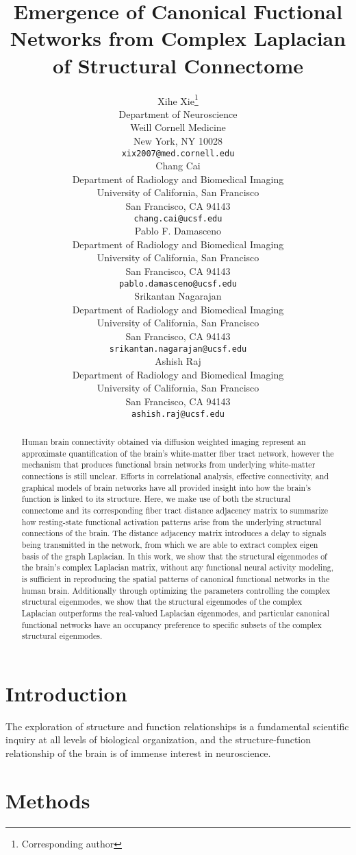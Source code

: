 \documentclass{article}
\title{Emergence of Canonical Fuctional Networks from Complex Laplacian of Structural Connectome}
\author{
  Xihe Xie\thanks{Corresponding author} \\
  Department of Neuroscience\\
  Weill Cornell Medicine\\
  New York, NY 10028 \\
  \texttt{xix2007@med.cornell.edu} \\
   \And
  Chang Cai \\
  Department of Radiology and Biomedical Imaging\\
  University of California, San Francisco\\
  San Francisco, CA 94143\\
  \texttt{chang.cai@ucsf.edu} \\
   \And
  Pablo F. Damasceno \\
  Department of Radiology and Biomedical Imaging\\
  University of California, San Francisco\\
  San Francisco, CA 94143\\
  \texttt{pablo.damasceno@ucsf.edu}\\
  \And
  Srikantan Nagarajan \\
  Department of Radiology and Biomedical Imaging\\
  University of California, San Francisco\\
  San Francisco, CA 94143\\
  \texttt{srikantan.nagarajan@ucsf.edu} \\
  \And
  Ashish Raj \\
  Department of Radiology and Biomedical Imaging\\
  University of California, San Francisco\\
  San Francisco, CA 94143\\
  \texttt{ashish.raj@ucsf.edu} \\
}
\begin{document}
\maketitle

\begin{abstract}
Human brain connectivity obtained via diffusion weighted imaging represent an approximate quantification of the brain's white-matter fiber tract network, however the mechanism that produces functional brain networks from underlying white-matter connections is still unclear. Efforts in correlational analysis, effective connectivity, and graphical models of brain networks have all provided insight into how the brain's function is linked to its structure. Here, we make use of both the structural connectome and its corresponding fiber tract distance adjacency matrix to summarize how resting-state functional activation patterns arise from the underlying structural connections of the brain. The distance adjacency matrix introduces a delay to signals being transmitted in the network, from which we are able to extract complex eigen basis of the graph Laplacian. In this work, we show that the structural eigenmodes of the brain's complex Laplacian matrix, without any functional neural activity modeling, is sufficient in reproducing the spatial patterns of canonical functional networks in the human brain. Additionally through optimizing the parameters controlling the complex structural eigenmodes, we show that the structural eigenmodes of the complex Laplacian outperforms the real-valued Laplacian eigenmodes, and particular canonical functional networks have an occupancy preference to specific subsets of the complex structural eigenmodes. 
\end{abstract}


\section{Introduction}
The exploration of structure and function relationships is a fundamental scientific inquiry at all levels of biological organization, and the structure-function relationship of the brain is of immense interest in neuroscience. 


\section{Methods}
\label{sec:methods}
\end{document}
